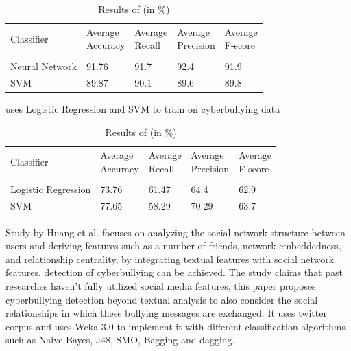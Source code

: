 \documentclass[10pt,conference]{IEEEtran}
\begin{document}
\begin{table}[htbp]
\caption{Results of \cite{b8} (in \%)}
\begin{tabular}{lllll}
Classifier     & \makecell{Average \\ Accuracy} & \makecell{Average \\ Recall} & \makecell{Average \\ Precision} & \makecell{Average \\ F-score} \\
\\
Neural Network & 91.76            & 91.7           & 92.4              & 91.9            \\
SVM            & 89.87            & 90.1           & 89.6              & 89.8           
\end{tabular}
\end{table}

\cite{b9} uses Logistic Regression and SVM to train on cyberbullying data

\begin{table}[htbp]
\caption{Results of \cite{b9} (in \%)}
\begin{tabular}{lllll}
Classifier     & \makecell{Average \\ Accuracy} & \makecell{Average \\ Recall} & \makecell{Average \\ Precision} & \makecell{Average \\ F-score} \\
\\
Logistic Regression & 73.76 & 61.47 & 64.4 & 62.9 \\
SVM            & 77.65 & 58.29 & 70.29 & 63.7 \\           
\end{tabular}
\end{table}

Study by Huang et al.\cite{b10} focuses on analyzing the social network structure between users and deriving features such as a number of friends, network embeddedness, and relationship centrality, by integrating textual features with social network features, detection of cyberbullying can be achieved. The study claims that past researches haven’t fully utilized social media features, this paper proposes cyberbullying detection beyond textual analysis to also consider the social relationships in which these bullying messages are exchanged. It uses twitter corpus and uses Weka 3.0 to implement it with different classification algorithms such as Naive Bayes, J48, SMO, Bagging and dagging.
\end{document}
